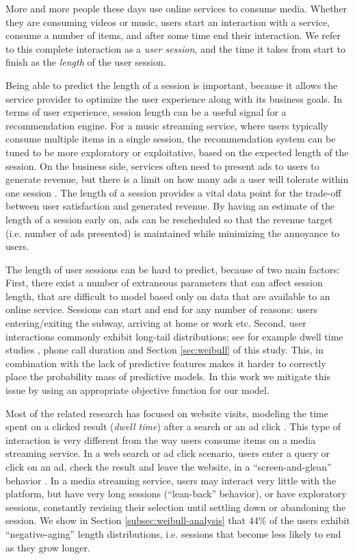 %


More and more people these days use online services to consume media.
Whether they are consuming videos or music, users start an interaction
with a service, consume a number of items, and after some time end their interaction.
We refer to this complete interaction as a \textit{user session}, and the time it takes from
start to finish as the \textit{length} of the user session. 

Being able to predict the length of a session is important, because it allows the service
provider to optimize the user experience along with its business goals.
In terms of user experience, session length can be a useful signal for a
recommendation engine. For a music streaming service, where users
typically consume multiple items in a single session, the recommendation system
can be tuned to be more exploratory or exploitative, based on the expected length
of the session. On the business side, services often need to present ads to users
to generate revenue, but there is a limit on how many ads a user will tolerate
within one session \cite{goldstein2013ads}.
The length of a session provides a vital data point for the trade-off between user satisfaction and
generated revenue.
By having an estimate of the length of a session early on, ads can be rescheduled
so that the revenue target (i.e. number of ads presented) is maintained while
minimizing the annoyance to users.

The length of user sessions can be hard to predict, because of
two main factors: First, there exist a number of extraneous
parameters that can affect session length, that are difficult to model
based only on data that are available to an online service.
Sessions can start and end for any number of reasons: users entering/exiting the subway, 
arriving at home or work etc.
Second, user interactions commonly exhibit long-tail distributions; see for example
dwell time studies \cite{liu2010weibull, Kim2014satisfaction},
phone call duration \cite{seshadri2008mobile} and Section \ref{sec:weibull} of this study.
This, in combination with
the lack of predictive features makes it harder
to correctly place the probability mass of predictive models.
In this work we mitigate this issue by using an appropriate objective function for
our model.

Most of the related research has focused on website visits, modeling the time spent on a clicked result (\textit{dwell time}) after a 
search \cite{Kim2014satisfaction, borisov2016catm} or an ad click \cite{Barbieri2016RSFclick, lalmas2015gemini}. This type
of interaction is very different from the way users consume items on a media streaming service.
In a web search or ad click scenario, users enter a query or click on an ad, check the result
and leave the website, in a ``screen-and-glean'' behavior \cite{liu2010weibull}.
In a media streaming service, users may interact very little with the 
platform, but have very long sessions (``lean-back'' behavior),
or have exploratory sessions, constantly revising their selection until settling down
or abandoning the session.
We show in Section \ref{subsec:weibull-analysis}
that 44\% of the users exhibit ``negative-aging'' length distributions, i.e. sessions
that become less likely to end as they grow longer.

